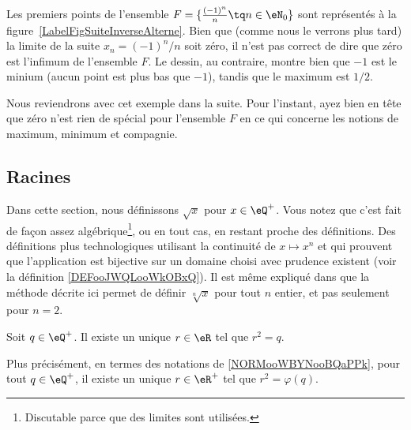 \begin{example}
	Les premiers points de l'ensemble \( F=\{ \frac{ (-1)^n }{ n }\tq n\in\eN_0 \}\) sont représentés à la figure~\ref{LabelFigSuiteInverseAlterne}. Bien que (comme nous le verrons plus tard) la limite de la suite \( x_n=(-1)^n/n\) soit zéro, il n'est pas correct de dire que zéro est l'infimum de l'ensemble \( F\). Le dessin, au contraire, montre bien que \( -1\) est le minium (aucun point est plus bas que \( -1\)), tandis que le maximum est \( 1/2\).

	Nous reviendrons avec cet exemple dans la suite. Pour l'instant, ayez bien en tête que zéro n'est rien de spécial pour l'ensemble \( F\) en ce qui concerne les notions de maximum, minimum et compagnie.
\end{example}
\newcommand{\CaptionFigSuiteInverseAlterne}{Les quelques premiers points du type \( (-1)^n/n\).}


\subsection{Racines}
\label{SUBSECooMBCNooEqjjTY}

Dans cette section, nous définissons \( \sqrt{ x }\) pour \( x\in\eQ^+\). Vous notez que c'est fait de façon assez algébrique\footnote{Discutable parce que des limites sont utilisées.}, ou en tout cas, en restant proche des définitions. Des définitions plus technologiques utilisant la continuité de \( x\mapsto x^n\) et qui prouvent que l'application est bijective sur un domaine choisi avec prudence existent (voir la définition \ref{DEFooJWQLooWkOBxQ}). Il est même expliqué dans \cite{BIBooMPXEooQLKhku} que la méthode décrite ici permet de définir \( \sqrt[n]{ x }\) pour tout \( n\) entier, et pas seulement pour \( n=2\).

\begin{proposition}     \label{PROPooUHKFooVKmpte}
	Soit \( q\in \eQ^+\). Il existe un unique \( r\in \eR\) tel que \( r^2=q\).

	Plus précisément, en termes des notations de \ref{NORMooWBYNooBQaPPk}, pour tout \( q\in \eQ^+\), il existe un unique \( r\in \eR^+\) tel que \( r^2=\varphi(q)\).
\end{proposition}

